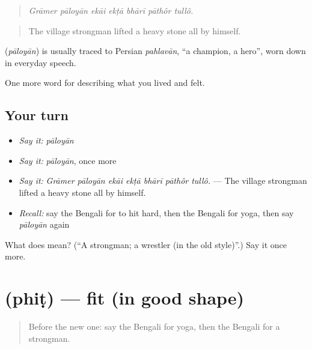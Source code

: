 \begin{quote}
\emph{Grāmer pāloyān ekāi ekṭā bhārī pāthôr tullô.}
\end{quote}

\begin{quote}
The village strongman lifted a heavy stone all by himself.
\end{quote}

\begin{cousinweb}
\textbf{} (\emph{pāloyān}) is usually traced to Persian \emph{pahlavān}, \textquotedblleft{}a champion, a hero\textquotedblright{}, worn down in everyday speech.
\end{cousinweb}

\begin{grammarlens}[title={What you've built}]
One more word for describing what you lived and felt.
\end{grammarlens}

\subsection*{Your turn}
\begin{itemize}
\raggedright
  \item \emph{Say it:} \emph{pāloyān}
  \item \emph{Say it:} \emph{pāloyān}, once more
  \item \emph{Say it:} \emph{Grāmer pāloyān ekāi ekṭā bhārī pāthôr tullô.} — The village strongman lifted a heavy stone all by himself.
  \item \emph{Recall:} say the Bengali for to hit hard, then the Bengali for yoga, then say \emph{pāloyān} again
\end{itemize}

\begin{tcolorbox}[breakable,colback=teal!4,colframe=teal!35!black,title={Before you move on}]
What does  mean? (\textquotedblleft{}A strongman; a wrestler (in the old style)\textquotedblright{}.) Say it once more.
\end{tcolorbox}
\section[\texorpdfstring{\bn{ফিট} (phiṭ)}{ফিট (phiṭ)}]{ (phiṭ) — fit (in good shape)}

\label{lesson:BN-C522-phit}



\begin{quote}
Before the new one: say the Bengali for yoga, then the Bengali for a strongman.
\end{quote}


